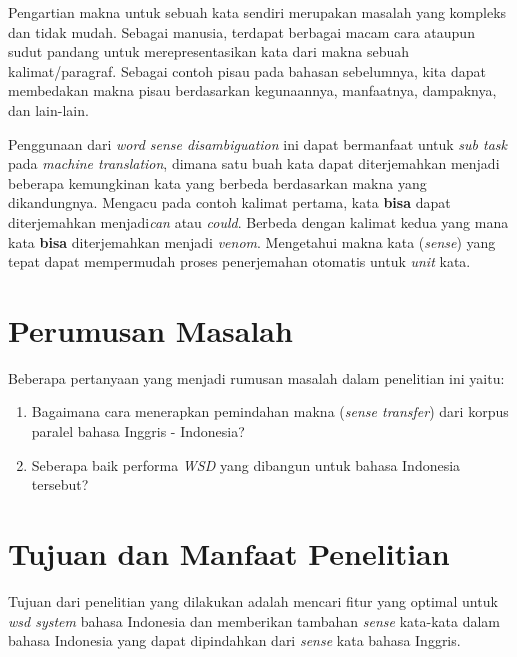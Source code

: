 Pengartian makna untuk sebuah kata sendiri merupakan masalah yang kompleks dan tidak mudah. Sebagai manusia, terdapat berbagai macam cara ataupun sudut pandang untuk merepresentasikan kata dari makna sebuah kalimat/paragraf. Sebagai contoh pisau pada bahasan sebelumnya, kita dapat membedakan makna pisau berdasarkan kegunaannya, manfaatnya, dampaknya, dan lain-lain.

Penggunaan dari \textit{word sense disambiguation} ini dapat bermanfaat untuk \textit{sub task} pada \textit{machine translation}, dimana satu buah kata dapat diterjemahkan menjadi beberapa kemungkinan kata yang berbeda berdasarkan makna yang dikandungnya. Mengacu pada contoh kalimat pertama, kata \textbf{bisa} dapat diterjemahkan menjadi\textit{can} atau \textit{could}. Berbeda dengan kalimat kedua yang mana kata \textbf{bisa} diterjemahkan menjadi \textit{venom}. Mengetahui makna kata (\textit{sense}) yang tepat dapat mempermudah proses penerjemahan otomatis untuk \textit{unit} kata.

\section{Perumusan Masalah}
Beberapa pertanyaan yang menjadi rumusan masalah dalam penelitian ini yaitu:
\begin{enumerate}
	\item Bagaimana cara menerapkan pemindahan makna (\textit{sense transfer}) dari korpus paralel bahasa Inggris - Indonesia?
	\item Seberapa baik performa \textit{WSD} yang dibangun untuk bahasa Indonesia tersebut?
\end{enumerate}

\section{Tujuan dan Manfaat Penelitian}
Tujuan dari penelitian yang dilakukan adalah mencari fitur yang optimal untuk \textit{wsd system} bahasa Indonesia dan memberikan tambahan \textit{sense} kata-kata dalam bahasa Indonesia yang dapat dipindahkan dari \textit{sense} kata bahasa Inggris.

